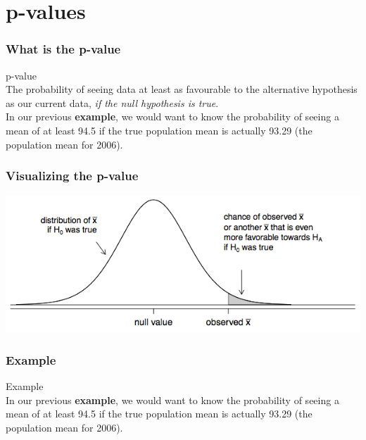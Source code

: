 \documentclass{beamer}\usepackage{graphicx, color}
\begin{document}
\section{p-values}

\begin{frame}[fragile]
  \frametitle{What is the p-value}
{\LARGE{p-value}} \\[0.5cm]
  The probability of seeing data at least as favourable to the alternative hypothesis as our current data, {\emph{if the null hypothesis is true}}. \\[0.5cm]
  In our previous {\bf{example}}, we would want to know the probability of seeing a mean of at least 94.5 if the true population mean is actually 93.29 (the population mean for 2006).
\end{frame}

\begin{frame}[fragile]
  \frametitle{Visualizing the p-value}
  \begin{center}
    \includegraphics[scale=0.5]{figure/AbstractP.png}
  \end{center}
\end{frame}

\begin{frame}[fragile]
  \frametitle{Example}
{\LARGE{Example}} \\[0.5cm]
  In our previous {\bf{example}}, we would want to know the probability of seeing a mean of at least 94.5 if the true population mean is actually 93.29 (the population mean for 2006). \\[0.5cm]
\end{frame}
\end{document}
